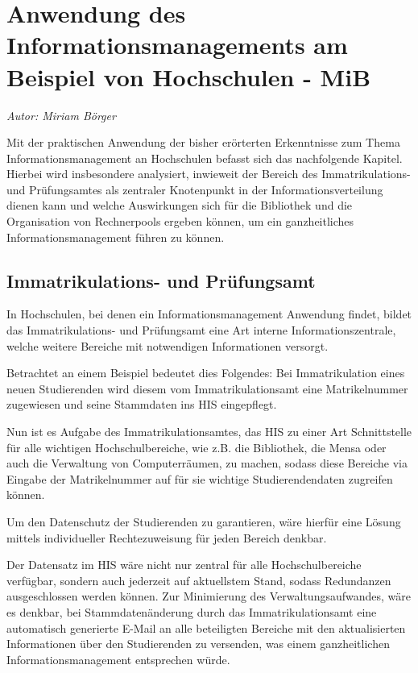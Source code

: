 \section{Anwendung des Informationsmanagements am Beispiel von Hochschulen - MiB}
\label{anwendung_des_inm_auf_hs}
\textit{Autor: Miriam Börger}

Mit der praktischen Anwendung der bisher erörterten Erkenntnisse zum Thema 
Informationsmanagement an Hochschulen befasst sich das nachfolgende Kapitel. 
Hierbei wird insbesondere analysiert, inwieweit der Bereich des Immatrikulations- und 
Prüfungsamtes als zentraler Knotenpunkt in der Informationsverteilung dienen kann und 
welche Auswirkungen sich für die Bibliothek und die Organisation von Rechnerpools ergeben 
können, um ein ganzheitliches Informationsmanagement führen zu können.

\subsection{Immatrikulations- und Prüfungsamt}
\label{immatrikulations_und_pruefungsamt}
In Hochschulen, bei denen ein Informationsmanagement Anwendung findet, bildet das Immatrikulations- und Prüfungsamt eine Art interne Informationszentrale, welche weitere Bereiche mit notwendigen Informationen versorgt. 

Betrachtet an einem Beispiel bedeutet dies Folgendes: Bei Immatrikulation eines neuen Studierenden wird diesem vom Immatrikulationsamt eine Matrikelnummer zugewiesen und seine Stammdaten ins HIS eingepflegt. 

Nun ist es Aufgabe des Immatrikulationsamtes, das HIS zu einer Art Schnittstelle für alle wichtigen Hochschulbereiche, wie z.B. die Bibliothek, die Mensa oder auch die Verwaltung von Computerräumen, zu machen, sodass diese Bereiche via Eingabe der Matrikelnummer auf für sie wichtige Studierendendaten zugreifen können.

Um den Datenschutz der Studierenden zu garantieren, wäre hierfür eine Lösung mittels individueller Rechtezuweisung für jeden Bereich denkbar.

Der Datensatz im HIS wäre nicht nur zentral für alle Hochschulbereiche verfügbar, sondern 
auch jederzeit auf aktuellstem Stand, sodass Redundanzen ausgeschlossen werden können. 
Zur Minimierung des Verwaltungsaufwandes, wäre es denkbar, bei Stammdatenänderung 
durch das Immatrikulationsamt eine automatisch generierte E-Mail an alle beteiligten 
Bereiche mit den aktualisierten Informationen über den Studierenden zu versenden, was 
einem ganzheitlichen Informationsmanagement entsprechen würde.

